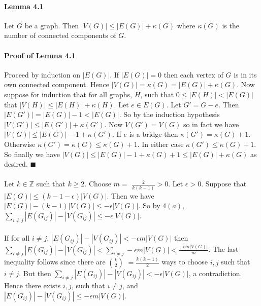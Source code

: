 \documentclass[letterpaper,12pt,oneside,onecolumn]{report}
\begin{document}
\paragraph{Lemma 4.1}
Let $G$ be a graph. Then $|V(G)| \leq |E(G)| + \kappa(G)$ where $\kappa(G)$ is the number of connected components of $G$.
\paragraph{Proof of Lemma 4.1}
Proceed by induction on $|E(G)|$. If $|E(G)| = 0$ then each vertex of $G$ is in its own connected component. Hence $|V(G)| = \kappa(G) = |E(G)| + \kappa(G)$. Now suppose for induction that for all graphs, $H$, such that $0 \leq |E(H)| < |E(G)|$ that $|V(H)| \leq |E(H)| + \kappa(H)$. Let $e \in E(G)$. Let $G' = G - e$. Then $|E(G')| = |E(G)| - 1 < |E(G)|$. So by the induction hypothesis $|V(G')| \leq |E(G')| + \kappa(G')$. Now $V(G') = V(G)$ so in fact we have $|V(G)| \leq |E(G)| - 1 + \kappa(G')$. If $e$ is a bridge then $\kappa(G') = \kappa(G) + 1$. Otherwise $\kappa(G') = \kappa(G) \leq \kappa(G) + 1$. In either case $\kappa(G') \leq \kappa(G) + 1$. So finally we have $|V(G)| \leq |E(G)| -1 + \kappa(G) + 1 \leq |E(G)| + \kappa(G)$ as desired. $\blacksquare$ 
\paragraph{}
Let $k \in \mathbb{Z}$ such that $k \geq 2$. Choose $m =$ $\frac{2}{k(k-1)} > 0$. Let $\epsilon > 0$. Suppose that $|E(G)| \leq (k - 1 - \epsilon) |V(G)|$. Then we have $|E(G)| - (k-1)|V(G)| \leq -\epsilon |V(G)|$. So by $4(a)$, $\sum_{i \neq j} |E(G_{ij})| - |V(G_{ij})| \leq -\epsilon |V(G)|$. 
\paragraph{}
If for all $i \neq j$, $|E(G_{ij})| - |V(G_{ij})| < - \epsilon m |V(G)|$ then $\sum_{i \neq j} |E(G_{ij})| - |V(G_{ij})| < \sum_{i \neq j } -  \epsilon m |V(G)| < \frac{-\epsilon m |V(G)|}{m}$. The last inequality follows since there are $k \choose 2$ $= \frac{k(k-1)}{2}$ ways to choose $i,j$ such that $i \neq j$. But then $\sum_{i \neq j} |E(G_{ij})| - |V(G_{ij})| < -\epsilon |V(G)|$, a contradiction. Hence there exists $i, j$, such that $i \neq j$, and $|E(G_{ij})| - |V(G_{ij})| \leq - \epsilon m |V(G)|$.
\end{document}
